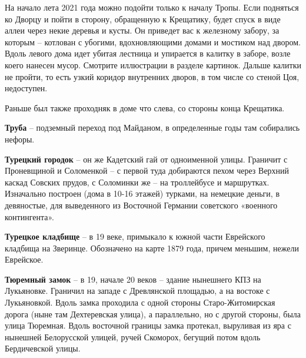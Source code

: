 На начало лета 2021 года можно подойти только к началу Тропы. Если подняться ко Дворцу и пойти в сторону, обращенную к Крещатику, будет спуск в виде аллеи через некие деревья и кусты. Он приведет вас к железному забору, за которым – котлован с убогими, вдохновляющими домами и мостиком над двором. Вдоль левого дома идет убитая лестница и упирается в калитку в заборе, возле коего нанесен мусор. Смотрите иллюстрации в разделе картинок. Дальше калитки не пройти, то есть узкий коридор внутренних дворов, в том числе со стеной Цоя, недоступен.

Раньше был также проходняк в доме что слева, со стороны конца Крещатика.\\

\medskip

\textbf{Труба} – подземный переход под Майданом, в определенные годы там собирались нефоры.\\

\medskip


\textbf{Турецкий городок} – он же Кадетский гай от одноименной улицы. Граничит с Проневщиной и Соломенкой – с первой туда добираются пехом через Верхний каскад Совских прудов, с Соломинки же – на троллейбусе и маршрутках. Изначально построен (дома в 10-16 этажей) турками, на немецкие деньги, в девяностые, для выведенного из Восточной Германии советского «военного контингента».\\

\medskip

\textbf{Турецкое кладбище} – в 19 веке, примыкало к южной части Еврейского кладбища на Зверинце. Обозначено на карте 1879 года, причем меньшим, нежели Еврейское.\\

\medskip

\textbf{Тюремный замок} – в 19, начале 20 веков – здание нынешнего КПЗ на Лукьяновке. Граничил на западе с Древлянской площадью, а на востоке с Лукьяновкой. Вдоль замка проходила с одной стороны Старо-Житомирская дорога (ныне там Дехтеревская улица), а параллельно, но с другой стороны, была улица Тюремная. Вдоль восточной границы замка протекал, выруливая из яра с нынешней Белорусской улицей, ручей Скоморох, бегущий потом вдоль Бердичевской улицы.
